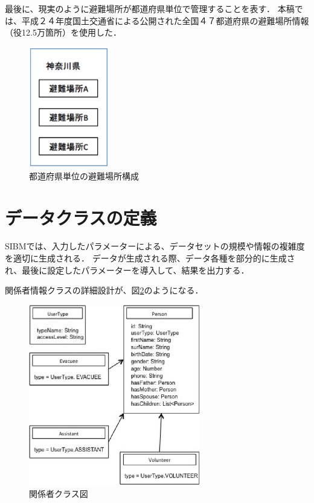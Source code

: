 最後に、現実のように避難場所が都道府県単位で管理することを表す．
本稿では、平成２４年度国土交通省による公開された全国４７都道府県の避難場所情報（役12.5万箇所）を使用した．

\begin{figure}[h!]
 	\begin{center}
 		\includegraphics[width=35mm]{./images/fig3.eps}
 		\caption{都道府県単位の避難場所構成}
 		\label{fig:sibm_prefecture}
 	\end{center}
\end{figure}

\section{データクラスの定義}

SIBMでは、入力したパラメーターによる、データセットの規模や情報の複雑度を適切に生成される．
データが生成される際、データ各種を部分的に生成され、最後に設定したパラメーターを導入して、結果を出力する．

関係者情報クラスの詳細設計が、図\ref{fig:sibm_class_person}のようになる．

\begin{figure}[h!]
 	\begin{center}
 		\includegraphics[width=75mm]{./images/class_person.eps}
 		\caption{関係者クラス図}
 		\label{fig:sibm_class_person}
 	\end{center}
\end{figure}

